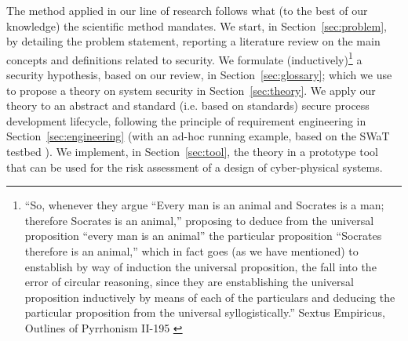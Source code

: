  The method applied in our line of research follows what
(to the best of our knowledge) the scientific method mandates. We start, in
Section~\ref{sec:problem}, by detailing the problem statement, reporting a
literature review on the main concepts and definitions related to security.  We
formulate (inductively)\footnote{``So, whenever they argue ``Every man is an
animal and Socrates is a man; therefore Socrates is an animal,'' proposing to
deduce from the universal proposition ``every man is an animal'' the particular
proposition ``Socrates therefore is an animal,'' which in fact goes (as we have
mentioned) to enstablish by way of induction the universal proposition, the
fall into the error of circular reasoning, since they are enstablishing the
universal proposition inductively by means of each of the particulars and
deducing the particular proposition from the universal syllogistically.''
Sextus Empiricus, Outlines of Pyrrhonism II-195
\autocite{Empiricus1990Pyrrhonism}} a security hypothesis, based on our review,
in Section~\ref{sec:glossary}; which we use to propose a theory on system security in
Section~\ref{sec:theory}. We apply our theory to an abstract and standard (i.e.
based on standards) secure process development lifecycle, following the
principle of requirement engineering in Section~\ref{sec:engineering} (with an
ad-hoc running example, based on the SWaT testbed \autocite{Mathur2016swat}).
We implement, in Section~\ref{sec:tool}, the theory in a prototype tool that can be used for the risk
assessment of a design of cyber-physical systems.
